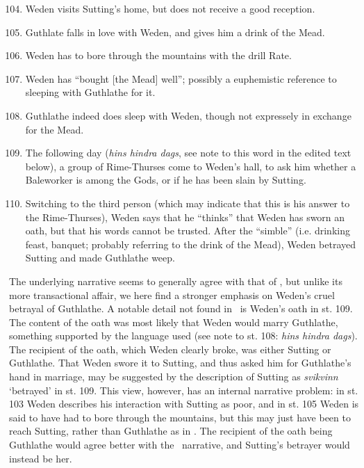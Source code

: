 \begin{enumerate}
	\setcounter{enumi}{103}
	\item Weden visits Sutting’s home, but does not receive a good reception.
	\item Guthlate falls in love with Weden, and gives him a drink of the Mead.
	\item Weden has to bore through the mountains with the drill Rate.
	\item Weden has “bought [the Mead] well”; possibly a euphemistic reference to sleeping with Guthlathe for it.
	\item Guthlathe indeed does sleep with Weden, though not expressely in exchange for the Mead.
	\item The following day (\emph{hins hindra dags}, see note to this word in the edited text below), a group of Rime-Thurses come to Weden’s hall, to ask him whether a Baleworker is among the Gods, or if he has been slain by Sutting.
	\item Switching to the third person (which may indicate that this is his answer to the Rime-Thurses), Weden says that he “thinks” that Weden has sworn an oath, but that his words cannot be trusted. After the “simble” (i.e. drinking feast, banquet; probably referring to the drink of the Mead), Weden betrayed Sutting and made Guthlathe weep.
\end{enumerate}

The underlying narrative seems to generally agree with that of \Skaldskaparmal, but unlike its more transactional affair, we here find a stronger emphasis on Weden’s cruel betrayal of Guthlathe. A notable detail not found in \Skaldskaparmal\ is Weden’s oath in st. 109. The content of the oath was most likely that Weden would marry Guthlathe, something supported by the language used (see note to st. 108: \emph{hins hindra dags}). The recipient of the oath, which Weden clearly broke, was either Sutting or Guthlathe. That Weden swore it to Sutting, and thus asked him for Guthlathe’s hand in marriage, may be suggested by the description of Sutting as \emph{svikvinn} ‘betrayed’ in st. 109. This view, however, has an internal narrative problem: in st. 103 Weden describes his interaction with Sutting as poor, and in st. 105 Weden is said to have had to bore through the mountains, but this may just have been to reach Sutting, rather than Guthlathe as in \Skaldskaparmal.
The recipient of the oath being Guthlathe would agree better with the \Skaldskaparmal\ narrative, and Sutting’s betrayer would instead be her.

